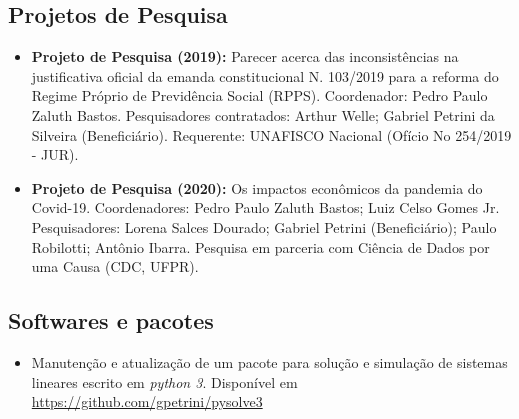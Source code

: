 \documentclass[11pt,a4paper]{article} \usepackage[utf8]{inputenc}
\begin{document}
\subsection{Projetos de Pesquisa}
\begin{itemize}
  \item \textbf{Projeto de Pesquisa (2019):} Parecer acerca das inconsistências na justificativa oficial da emanda constitucional N. 103/2019 para a reforma do Regime Próprio de Previdência Social (RPPS). Coordenador: Pedro Paulo Zaluth Bastos. Pesquisadores contratados: Arthur Welle; Gabriel Petrini da Silveira (Beneficiário). Requerente: UNAFISCO Nacional (Ofício No 254/2019 - JUR).
  \item \textbf{Projeto de Pesquisa (2020):} Os impactos econômicos da pandemia do Covid-19. Coordenadores: Pedro Paulo Zaluth Bastos; Luiz Celso Gomes Jr. Pesquisadores: Lorena Salces Dourado; Gabriel Petrini (Beneficiário); Paulo Robilotti; Antônio Ibarra. Pesquisa em parceria com Ciência de Dados por uma Causa (CDC, UFPR).
\end{itemize}

\subsection{Softwares e pacotes}
\begin{itemize}
  \item Manutenção e atualização de um pacote para solução e simulação de sistemas lineares escrito em \textit{python 3}. Disponível em \url{https://github.com/gpetrini/pysolve3}
\end{itemize}
\end{document}
